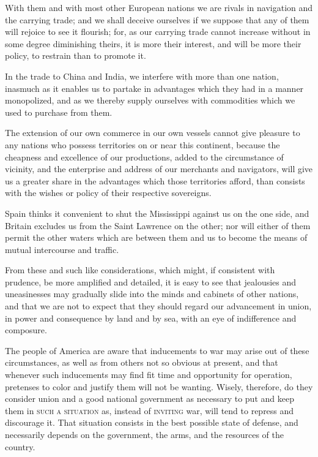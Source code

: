 With them and with most other European nations we are rivals in navigation and the carrying trade; and we shall deceive ourselves if we suppose that any of them will rejoice to see it flourish; for, as our carrying trade cannot increase without in some degree diminishing theirs, it is more their interest, and will be more their policy, to restrain than to promote it.

In the trade to China and India, we interfere with more than one nation, inasmuch as it enables us to partake in advantages which they had in a manner monopolized, and as we thereby supply ourselves with commodities which we used to purchase from them.

The extension of our own commerce in our own vessels cannot give pleasure to any nations who possess territories on or near this continent, because the cheapness and excellence of our productions, added to the circumstance of vicinity, and the enterprise and address of our merchants and navigators, will give us a greater share in the advantages which those territories afford, than consists with the wishes or policy of their respective sovereigns.

Spain thinks it convenient to shut the Mississippi against us on the one side, and Britain excludes us from the Saint Lawrence on the other; nor will either of them permit the other waters which are between them and us to become the means of mutual intercourse and traffic.

From these and such like considerations, which might, if consistent with prudence, be more amplified and detailed, it is easy to see that jealousies and uneasinesses may gradually slide into the minds and cabinets of other nations, and that we are not to expect that they should regard our advancement in union, in power and consequence by land and by sea, with an eye of indifference and composure.

The people of America are aware that inducements to war may arise out of these circumstances, as well as from others not so obvious at present, and that whenever such inducements may find fit time and opportunity for operation, pretenses to color and justify them will not be wanting. Wisely, therefore, do they consider union and a good national government as necessary to put and keep them in \textsc{such a situation} as, instead of \textsc{inviting} war, will tend to repress and discourage it. That situation consists in the best possible state of defense, and necessarily depends on the government, the arms, and the resources of the country.

